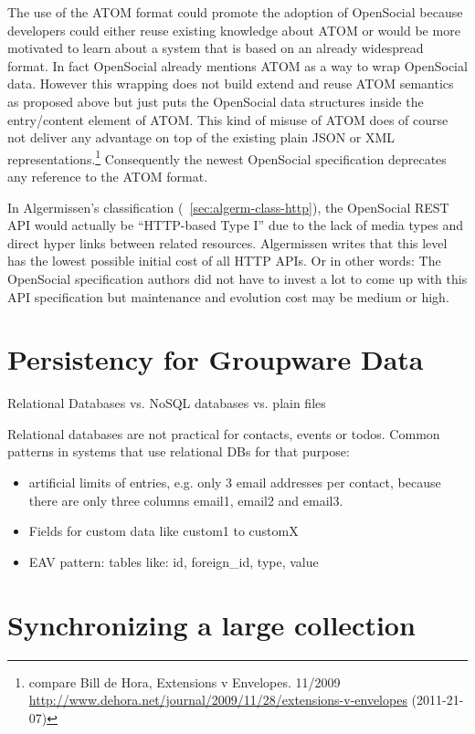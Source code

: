 \documentclass[12pt,a4paper]{scrartcl}		%
\newcommand{\citeurl}[2]{\url{#1} (#2)}
\begin{document}
The use of the ATOM format could promote the adoption of OpenSocial because
developers could either reuse existing knowledge about ATOM or would be more
motivated to learn about a system that is based on an already widespread
format. In fact OpenSocial already mentions ATOM as a way to wrap OpenSocial
data. However this wrapping does not build extend and reuse ATOM semantics as
proposed above but just puts the OpenSocial data structures inside the
entry/content element of ATOM. This kind of misuse of ATOM does of course not
deliver any advantage on top of the existing plain JSON or XML
representations.\footnote{compare Bill de Hora, Extensions v Envelopes. 11/2009 \newline
  \citeurl{http://www.dehora.net/journal/2009/11/28/extensions-v-envelopes}{2011-21-07}}
Consequently the newest OpenSocial specification deprecates any reference to the
ATOM format.

In Algermissen's classification (~\ref{sec:algerm-class-http}), the OpenSocial
REST API would actually be ``HTTP-based Type I'' due to the lack of media types
and direct hyper links between related resources. Algermissen writes that this
level has the lowest possible initial cost of all HTTP APIs. Or in other words:
The OpenSocial specification authors did not have to invest a lot to come up
with this API specification but maintenance and evolution cost may be medium or
high.


\section{Persistency for Groupware Data}
Relational Databases vs. NoSQL databases vs. plain files

Relational databases are not practical for contacts, events or todos. Common patterns in systems that use relational DBs for that purpose:
\begin{itemize}
\item artificial limits of entries, e.g. only 3 email addresses per contact, because there are only three columns email1, email2 and email3.
\item Fields for custom data like custom1 to customX
\item EAV pattern: tables like: id, foreign\_id, type, value
\end{itemize}
\section{Synchronizing a large collection}
\end{document}
